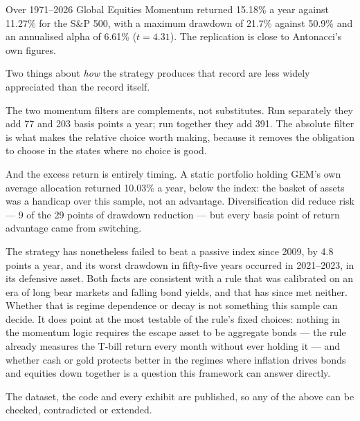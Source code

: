 \documentclass[11pt,a4paper]{article}
\begin{document}
Over 1971--2026 Global Equities Momentum returned 15.18\% a year against
11.27\% for the S\&P 500, with a maximum drawdown of 21.7\% against 50.9\% and
an annualised alpha of 6.61\% ($t = 4.31$). The replication is close to
Antonacci's own figures.

Two things about \emph{how} the strategy produces that record are less widely
appreciated than the record itself.

The two momentum filters are complements, not substitutes. Run separately they
add 77 and 203 basis points a year; run together they add 391. The absolute
filter is what makes the relative choice worth making, because it removes the
obligation to choose in the states where no choice is good.

And the excess return is entirely timing. A static portfolio holding GEM's own
average allocation returned 10.03\% a year, below the index: the basket of
assets was a handicap over this sample, not an advantage. Diversification did
reduce risk --- 9 of the 29 points of drawdown reduction --- but every basis
point of return advantage came from switching.

The strategy has nonetheless failed to beat a passive index since 2009, by 4.8
points a year, and its worst drawdown in fifty-five years occurred in
2021--2023, in its defensive asset. Both facts are consistent with a rule that
was calibrated on an era of long bear markets and falling bond yields, and that
has since met neither. Whether that is regime dependence or decay is not
something this sample can decide. It does point at the most testable of the
rule's fixed choices: nothing in the momentum logic requires the escape asset
to be aggregate bonds --- the rule already measures the T-bill return every
month without ever holding it --- and whether cash or gold protects better in
the regimes where inflation drives bonds and equities down together is a
question this framework can answer directly.

The dataset, the code and every exhibit are published, so any of the above can
be checked, contradicted or extended.

\newpage


\newpage
\appendix
\end{document}

